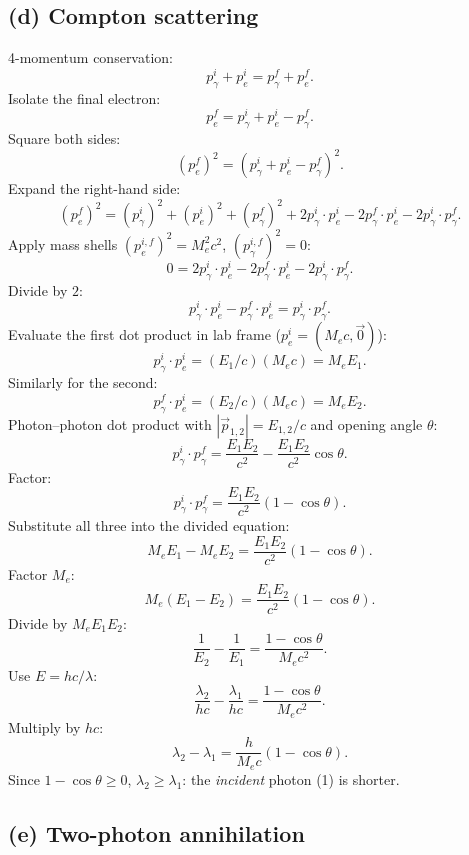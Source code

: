 \documentclass[11pt]{article}
\begin{document}
\subsection*{(d) Compton scattering}

4-momentum conservation:
\[ p_\gamma^i+p_e^i=p_\gamma^f+p_e^f. \]
Isolate the final electron:
\[ p_e^f=p_\gamma^i+p_e^i-p_\gamma^f. \]
Square both sides:
\[ (p_e^f)^2=(p_\gamma^i+p_e^i-p_\gamma^f)^2. \]
Expand the right-hand side:
\[ (p_e^f)^2=(p_\gamma^i)^2+(p_e^i)^2+(p_\gamma^f)^2+2p_\gamma^i\cdot p_e^i-2p_\gamma^f\cdot p_e^i-2p_\gamma^i\cdot p_\gamma^f. \]
Apply mass shells $(p_e^{i,f})^2=M_e^2c^2$, $(p_\gamma^{i,f})^2=0$:
\[ 0=2p_\gamma^i\cdot p_e^i-2p_\gamma^f\cdot p_e^i-2p_\gamma^i\cdot p_\gamma^f. \]
Divide by $2$:
\[ p_\gamma^i\cdot p_e^i-p_\gamma^f\cdot p_e^i=p_\gamma^i\cdot p_\gamma^f. \]
Evaluate the first dot product in lab frame ($p_e^i=(M_ec,\vec 0)$):
\[ p_\gamma^i\cdot p_e^i=(E_1/c)(M_ec)=M_eE_1. \]
Similarly for the second:
\[ p_\gamma^f\cdot p_e^i=(E_2/c)(M_ec)=M_eE_2. \]
Photon--photon dot product with $|\vec p_{1,2}|=E_{1,2}/c$ and opening angle $\theta$:
\[ p_\gamma^i\cdot p_\gamma^f=\frac{E_1E_2}{c^2}-\frac{E_1E_2}{c^2}\cos\theta. \]
Factor:
\[ p_\gamma^i\cdot p_\gamma^f=\frac{E_1E_2}{c^2}(1-\cos\theta). \]
Substitute all three into the divided equation:
\[ M_eE_1-M_eE_2=\frac{E_1E_2}{c^2}(1-\cos\theta). \]
Factor $M_e$:
\[ M_e(E_1-E_2)=\frac{E_1E_2}{c^2}(1-\cos\theta). \]
Divide by $M_eE_1E_2$:
\[ \frac{1}{E_2}-\frac{1}{E_1}=\frac{1-\cos\theta}{M_ec^2}. \]
Use $E=hc/\lambda$:
\[ \frac{\lambda_2}{hc}-\frac{\lambda_1}{hc}=\frac{1-\cos\theta}{M_ec^2}. \]
Multiply by $hc$:
\begin{equation}
\boxed{\,\lambda_2-\lambda_1=\frac{h}{M_ec}(1-\cos\theta).\,}
\label{eq:Q1d-compton}
\end{equation}
Since $1-\cos\theta\geq 0$, $\lambda_2\geq\lambda_1$: the \emph{incident} photon (1) is shorter.

\subsection*{(e) Two-photon annihilation}
\end{document}
